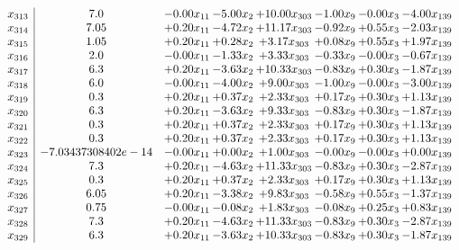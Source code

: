 \documentclass[8pt]{article}
\begin{document}
\[\begin{array}{c| c c@{\hskip 2pt} c@{\hskip 2pt} c@{\hskip 2pt} c@{\hskip 2pt} c@{\hskip 2pt} c@{\hskip 2pt} }
 x_{313}   &  7.0 & -0.00 x_{11} & -5.00 x_{2} & + 10.00 x_{303} & -1.00 x_{9} & -0.00 x_{3} & -4.00 x_{139}\\
 x_{314}   &  7.05 & +  0.20 x_{11} & -4.72 x_{2} & + 11.17 x_{303} & -0.92 x_{9} & +  0.55 x_{3} & -2.03 x_{139}\\
 x_{315}   &  1.05 & +  0.20 x_{11} & +  0.28 x_{2} & +  3.17 x_{303} & +  0.08 x_{9} & +  0.55 x_{3} & +  1.97 x_{139}\\
 x_{316}   &  2.0 & -0.00 x_{11} & -1.33 x_{2} & +  3.33 x_{303} & -0.33 x_{9} & -0.00 x_{3} & -0.67 x_{139}\\
 x_{317}   &  6.3 & +  0.20 x_{11} & -3.63 x_{2} & + 10.33 x_{303} & -0.83 x_{9} & +  0.30 x_{3} & -1.87 x_{139}\\
 x_{318}   &  6.0 & -0.00 x_{11} & -4.00 x_{2} & +  9.00 x_{303} & -1.00 x_{9} & -0.00 x_{3} & -3.00 x_{139}\\
 x_{319}   &  0.3 & +  0.20 x_{11} & +  0.37 x_{2} & +  2.33 x_{303} & +  0.17 x_{9} & +  0.30 x_{3} & +  1.13 x_{139}\\
 x_{320}   &  6.3 & +  0.20 x_{11} & -3.63 x_{2} & +  9.33 x_{303} & -0.83 x_{9} & +  0.30 x_{3} & -1.87 x_{139}\\
 x_{321}   &  0.3 & +  0.20 x_{11} & +  0.37 x_{2} & +  2.33 x_{303} & +  0.17 x_{9} & +  0.30 x_{3} & +  1.13 x_{139}\\
 x_{322}   &  0.3 & +  0.20 x_{11} & +  0.37 x_{2} & +  2.33 x_{303} & +  0.17 x_{9} & +  0.30 x_{3} & +  1.13 x_{139}\\
 x_{323}   &  -7.03437308402e-14 & -0.00 x_{11} & +  0.00 x_{2} & +  1.00 x_{303} & -0.00 x_{9} & -0.00 x_{3} & +  0.00 x_{139}\\
 x_{324}   &  7.3 & +  0.20 x_{11} & -4.63 x_{2} & + 11.33 x_{303} & -0.83 x_{9} & +  0.30 x_{3} & -2.87 x_{139}\\
 x_{325}   &  0.3 & +  0.20 x_{11} & +  0.37 x_{2} & +  2.33 x_{303} & +  0.17 x_{9} & +  0.30 x_{3} & +  1.13 x_{139}\\
 x_{326}   &  6.05 & +  0.20 x_{11} & -3.38 x_{2} & +  9.83 x_{303} & -0.58 x_{9} & +  0.55 x_{3} & -1.37 x_{139}\\
 x_{327}   &  0.75 & -0.00 x_{11} & -0.08 x_{2} & +  1.83 x_{303} & -0.08 x_{9} & +  0.25 x_{3} & +  0.83 x_{139}\\
 x_{328}   &  7.3 & +  0.20 x_{11} & -4.63 x_{2} & + 11.33 x_{303} & -0.83 x_{9} & +  0.30 x_{3} & -2.87 x_{139}\\
 x_{329}   &  6.3 & +  0.20 x_{11} & -3.63 x_{2} & + 10.33 x_{303} & -0.83 x_{9} & +  0.30 x_{3} & -1.87 x_{139}\\

\end{array}\]
\end{document}
